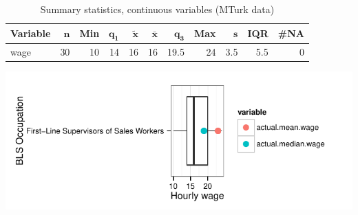 \documentclass[a4paper,10pt]{article}\usepackage[]{graphicx}\usepackage[]{color}
\makeatletter
\def\maxwidth{ %
  \ifdim\Gin@nat@width>\linewidth
    \linewidth
  \else
    \Gin@nat@width
  \fi
}
\makeatother
\begin{document}
\begin{table}[ht]
\centering
{\footnotesize
\begin{tabular}{lrrrrrrrrrr}
 \textbf{Variable} & $\mathbf{n}$ & \textbf{Min} & $\mathbf{q_1}$ & $\mathbf{\widetilde{x}}$ & $\mathbf{\bar{x}}$ & $\mathbf{q_3}$ & \textbf{Max} & $\mathbf{s}$ & \textbf{IQR} & \textbf{\#NA} \\ 
  \hline
wage & 30 & 10 & 14 & 16 & 16 & 19.5 & 24 & 3.5 & 5.5 & 0 \\ 
  \end{tabular}
}
\caption{Summary statistics, continuous variables (MTurk data)} 
\label{tab2:41-1010}
\end{table}


{\centering \includegraphics[width=\maxwidth]{figure/unnamed-chunk-219} 

}
\end{document}
